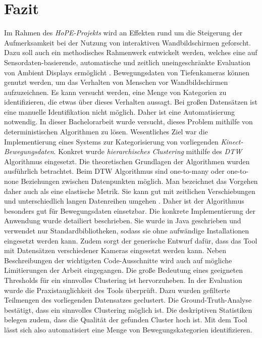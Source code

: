 \chapter{Fazit}
\label{chapter7}
Im Rahmen des \emph{HoPE-Projekts} wird an Effekten
rund um die Steigerung der Aufmerksamkeit bei der Nutzung von interaktiven Wandbildschirmen geforscht.
Dazu soll auch ein methodisches Rahmenwerk entwickelt werden, welches eine auf Sensordaten-basierende,
automatische und zeitlich uneingeschränkte Evaluation von Ambient Displays ermöglicht \citep{unibw_honeypot-effekt_2021}.
Bewegungsdaten von Tiefenkameras können genutzt werden,
um das Verhalten von Menschen vor Wandbildschirmen aufzuzeichnen.
Es kann versucht werden, eine Menge von Kategorien zu identifizieren,
die etwas über dieses Verhalten aussagt.
Bei großen Datensätzen ist eine manuelle Identifikation nicht möglich.
Daher ist eine Automatisierung notwendig.
In dieser Bachelorarbeit wurde versucht, dieses Problem mithilfe von deterministischen Algorithmen zu lösen.
Wesentliches Ziel war die Implementierung eines Systems zur Kategorisierung von vorliegenden \emph{Kinect-Bewegungsdaten}.
Konkret wurde \emph{hierarchisches Clustering} mithilfe des \emph{\ac{DTW}} Algorithmus eingesetzt.
Die theoretischen Grundlagen der Algorithmen wurden ausführlich betrachtet. 
Beim \ac{DTW} Algorithmus sind one-to-many oder one-to-none Beziehungen zwischen Datenpunkten möglich.
Man bezeichnet das Vorgehen daher auch als eine elastische Metrik.
Sie kann gut mit zeitlichen Verschiebungen und unterschiedlich langen Datenreihen umgehen \citep{aghabozorgi_time-series_2015}.
Daher ist der Algorithmus besonders gut für Bewegungsdaten einsetzbar.
Die konkrete Implementierung der Anwendung wurde detailiert beschrieben.
Sie wurde in Java geschrieben und verwendet nur Standardbibliotheken,
sodass sie ohne aufwändige Installationen eingesetzt werden kann.
Zudem sorgt der generische Entwurf dafür, dass das Tool mit Datensätzen verschiedener Kameras eingesetzt werden kann.
Neben Beschreibungen der wichtigsten Code-Ausschnitte
wird auch auf mögliche Limitierungen der Arbeit eingegangen.
Die große Bedeutung eines geeigneten Thresholds für ein sinnvolles Clustering ist hervorzuheben.
In der Evaluation wurde die Praxistauglichkeit des Tools überprüft.
Dazu wurden gefilterte Teilmengen des vorliegenden Datensatzes geclustert.
Die Ground-Truth-Analyse bestätigt, dass ein sinnvolles Clustering möglich ist.
Die deskriptiven Statistiken belegen zudem, dass die Qualität der gefunden Cluster hoch ist.
Mit dem Tool lässt sich also automatisiert eine Menge von Bewegungskategorien identifizieren.